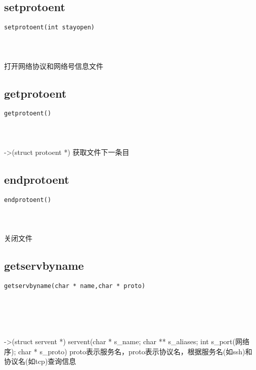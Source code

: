 \documentclass[10pt,a4paper]{article}
\begin{document}
\subsection{setprotoent}
\begin{spacing}{2.0}
\lstset{language=C,numbers=none}
\begin{lstlisting}
setprotoent(int stayopen)
\end{lstlisting}
{\large\color[rgb]{0.2,0.4,0.6}{stayopen:}}
\paragraph{ \ \ }打开网络协议和网络号信息文件
\end{spacing}

\subsection{getprotoent}
\begin{spacing}{2.0}
\lstset{language=C,numbers=none}
\begin{lstlisting}
getprotoent()
\end{lstlisting}
\paragraph{ \ \ }->(struct protoent *) 获取文件下一条目
\end{spacing}

\subsection{endprotoent}
\begin{spacing}{2.0}
\lstset{language=C,numbers=none}
\begin{lstlisting}
endprotoent()
\end{lstlisting}
\paragraph{ \ \ }关闭文件
\end{spacing}

\subsection{getservbyname}
\begin{spacing}{2.0}
\lstset{language=C,numbers=none}
\begin{lstlisting}
getservbyname(char * name,char * proto)
\end{lstlisting}
{\large\color[rgb]{0.2,0.4,0.6}{name:}} \\
{\large\color[rgb]{0.2,0.4,0.6}{proto:}}
\paragraph{ \ \ }->(struct servent *) servent(char * s\_name; char ** s\_aliases; int s\_port(网络序); char * s\_proto) proto表示服务名，proto表示协议名，根据服务名(如ssh)和协议名(如tcp)查询信息
\end{spacing}
\end{document}
